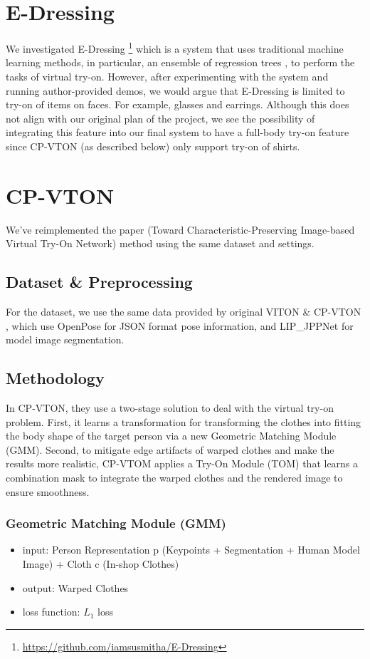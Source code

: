 \documentclass{article}
\begin{document}
\section{E-Dressing}
We investigated E-Dressing \footnote{\url{https://github.com/iamsusmitha/E-Dressing}} which is a system that uses traditional machine learning methods, in particular, an ensemble of regression trees \cite{kazemi2014one}, to perform the tasks of virtual try-on. However, after experimenting with the system and running author-provided demos, we would argue that E-Dressing is limited to try-on of items on faces. For example, glasses and earrings. Although this does not align with our original plan of the project, we see the possibility of integrating this feature into our final system to have a full-body try-on feature since CP-VTON (as described below) only support try-on of shirts. 


\section{CP-VTON}
We've reimplemented the paper (Toward Characteristic-Preserving Image-based Virtual Try-On Network) method using the same dataset and settings.

\subsection{Dataset \& Preprocessing}
For the dataset, we use the same data provided by original VITON \& CP-VTON \cite{viton-data}, which use OpenPose\cite{cao2018openpose} for JSON format pose information, and LIP\_JPPNet\cite{liang2018look} for model image segmentation.

\subsection{Methodology}
In CP-VTON, they use a two-stage solution to deal with the virtual try-on problem. First, it learns a transformation for transforming the clothes into fitting the body shape of the target person via a new Geometric Matching Module (GMM). Second, to mitigate edge artifacts of warped clothes and make the results more realistic, CP-VTOM applies a Try-On Module (TOM) that learns a combination mask to integrate the warped clothes and the  rendered image to ensure smoothness.
\subsubsection{Geometric Matching Module (GMM)}
    \begin{itemize}
        \item input: Person Representation p (Keypoints + Segmentation + Human Model Image) + Cloth c (In-shop Clothes)
        \item output: Warped Clothes
        \item loss function: $L_{1}$ loss
    \end{itemize}
\end{document}

